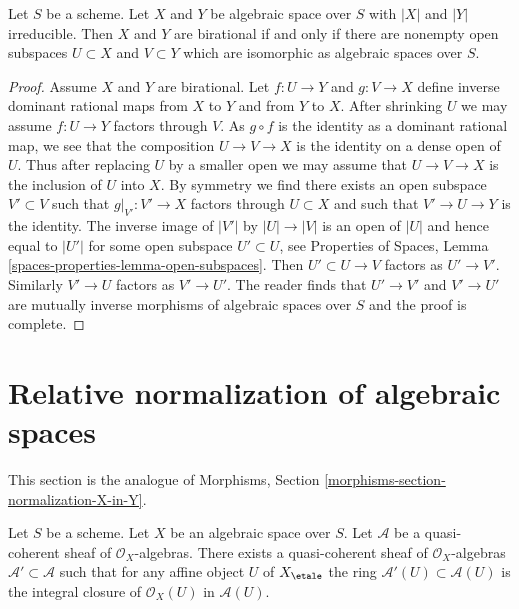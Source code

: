\begin{lemma}
\label{lemma-birational}
Let $S$ be a scheme. Let $X$ and $Y$ be algebraic
space over $S$ with $|X|$ and $|Y|$ irreducible.
Then $X$ and $Y$ are birational if and only if
there are nonempty open subspaces $U \subset X$ and $V \subset Y$
which are isomorphic as algebraic spaces over $S$.
\end{lemma}

\begin{proof}
Assume $X$ and $Y$ are birational. Let $f : U \to Y$ and $g : V \to X$
define inverse dominant rational maps from $X$ to $Y$ and from $Y$ to $X$.
After shrinking $U$ we may assume $f : U \to Y$ factors through $V$.
As $g \circ f$ is the identity as a dominant rational map, we see that
the composition $U \to V \to X$ is the identity on a dense open of $U$.
Thus after replacing $U$ by a smaller open we may assume that
$U \to V \to X$ is the inclusion of $U$ into $X$.
By symmetry we find there exists an open subspace $V' \subset V$
such that $g|_{V'} : V' \to X$ factors through $U \subset X$
and such that $V' \to U \to Y$ is the identity.
The inverse image of $|V'|$ by $|U| \to |V|$ is an open of $|U|$
and hence equal to $|U'|$ for some open subspace $U' \subset U$, see
Properties of Spaces, Lemma \ref{spaces-properties-lemma-open-subspaces}.
Then $U' \subset U \to V$ factors as $U' \to V'$.
Similarly $V' \to U$ factors as $V' \to U'$.
The reader finds that $U' \to V'$
and $V' \to U'$ are mutually inverse
morphisms of algebraic spaces over $S$
and the proof is complete.
\end{proof}









\section{Relative normalization of algebraic spaces}
\label{section-normalization-X-in-Y}

\noindent
This section is the analogue of
Morphisms, Section \ref{morphisms-section-normalization-X-in-Y}.

\begin{lemma}
\label{lemma-integral-closure}
Let $S$ be a scheme. Let $X$ be an algebraic space over $S$.
Let $\mathcal{A}$ be a quasi-coherent sheaf of $\mathcal{O}_X$-algebras.
There exists a quasi-coherent sheaf of $\mathcal{O}_X$-algebras
$\mathcal{A}' \subset \mathcal{A}$ such that
for any affine object $U$ of $X_\etale$ the ring
$\mathcal{A}'(U) \subset \mathcal{A}(U)$ is
the integral closure of $\mathcal{O}_X(U)$ in $\mathcal{A}(U)$.
\end{lemma}

